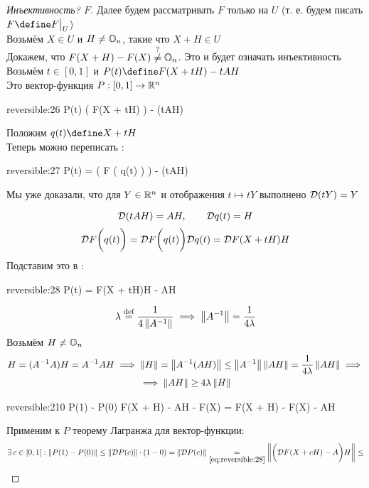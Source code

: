 \begin{proof}[Инъективность\comment? $ F $]
	Далее будем рассматривать $ F $ только на $ U $ (т. е. будем писать $ F \define F\clamp{U} $) \\
	Возьмём $ X \in U $ и $ H \ne \mathbb{O}_{n} $, такие что $ X + H \in U $ \\
	Докажем, что $ F(X + H) - F(X) \stackrel?\ne \mathbb{O}_{n} $. Это и будет означать инъективность \\
	Возьмём $ t \in [0, 1] $ и $ P(t) \define F(X + tH) - tAH $ \\
	Это вектор-функция $ P : [0, 1] \to \mathbb{R}^n $
	\begin{equ}{reversible:26}
		P(t)   \bigg( F(X + tH) \bigg) - (tAH)
	\end{equ}
	Положим $ q(t) \define X + tH $ \\
	Теперь можно переписать :
	\begin{equ}{reversible:27}
		P(t) =  \bigg( F \big( q(t) \big) \bigg) - (tAH)
	\end{equ}
	\begin{remind}
		Мы уже  доказали, что для $ Y \in \mathbb{R}^n $ и отображения $ t \mapsto tY $ выполнено $ \mathcal{D}(tY) = Y $
	\end{remind}
	$$ \mathcal{D}(tAH) = AH, \qquad \mathcal{D}q(t) = H $$
	$$ \mathcal{D}F \bigg( q(t) \bigg) = \mathcal{D}F \bigg( q(t) \bigg)\mathcal{D}q(t) = \mathcal{D}F(X + tH)H $$
	Подставим это в :
	\begin{equ}{reversible:28}
		P(t) = F(X + tH)H - AH
	\end{equ}
	$$ \lambda \stackrel{\text{def}}{=} \frac1{4\left\|{A^{-1}}\right\|} \implies \left\|{A^{-1}}\right\| = \frac1{4\lambda} $$
	Возьмём $ H \ne \mathbb{O}_{n} $
	\begin{multline}\lbl{reversible:29}
		H = (A^{-1}A)H = A^{-1}AH \implies \norm{H} = \norm{A^{-1}(AH)} \le \norm{A^{-1}}\norm{AH} = \frac1{4\lambda}\norm{AH} \implies \\
		\implies \norm{AH} \ge 4\lambda\norm{H}
	\end{multline}
	\begin{equ}{reversible:210}
		P(1) - P(0)  F(X + H) - AH - F(X) = F(X + H) - F(X) - AH
	\end{equ}
	Применим к $ P $ теорему Лагранжа для вектор-функции:
	\begin{multline}\lbl{reversible:211}
		\exist c \in [0, 1] : \norm{P(1) - P(0)} \le \norm{\mc{D}P(c)} \cdot (1 - 0) = \norm{\mc{D}P(c)} \underset{\eref{reversible:28}}= \norm{ \bigg( \mc{D}F(X + cH) - A \bigg)H} \le \\

\end{multline}
\end{proof}
